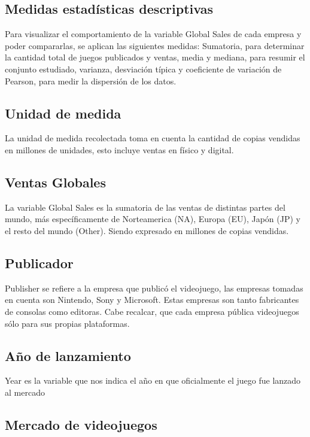 \documentclass[oneside,11pt]{Latex/Classes/PhDthesisPSnPDF}
\begin{document}
\subsection{Medidas estadísticas descriptivas}

Para visualizar el comportamiento de la variable Global Sales de cada
empresa y poder compararlas, se aplican las siguientes medidas:
Sumatoria, para determinar la cantidad total de juegos publicados y
ventas, media y mediana, para resumir el conjunto estudiado, varianza,
desviación típica y coeficiente de variación de Pearson, para medir la
dispersión de los datos.

\subsection{Unidad de medida}

La unidad de medida recolectada toma en cuenta la cantidad de copias
vendidas en millones de unidades, esto incluye ventas en físico y
digital.

\subsection{Ventas Globales}

La variable Global Sales es la sumatoria de las ventas de distintas
partes del mundo, más específicamente de Norteamerica (NA), Europa (EU),
Japón (JP) y el resto del mundo (Other). Siendo expresado en millones de
copias vendidas.

\subsection{Publicador}

Publisher se refiere a la empresa que publicó el videojuego, las
empresas tomadas en cuenta son Nintendo, Sony y Microsoft. Estas
empresas son tanto fabricantes de consolas como editoras. Cabe recalcar,
que cada empresa pública videojuegos sólo para sus propias plataformas.

\subsection{Año de lanzamiento}

Year es la variable que nos indica el año en que oficialmente el juego
fue lanzado al mercado

\subsection{Mercado de videojuegos}
\end{document}
